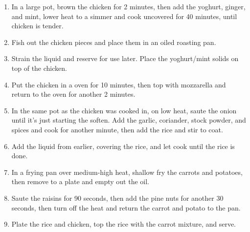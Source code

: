 \begin{enumerate}
    \item In a large pot, brown the chicken for 2 minutes, then add the yoghurt, ginger, and mint, lower heat to a simmer and cook uncovered for 40 minutes, until chicken is tender.
    \item Fish out the chicken pieces and place them in an oiled roasting pan.
    \item Strain the liquid and reserve for use later. Place the yoghurt/mint solids on top of the chicken.
    \item Put the chicken in a  oven for 10 minutes, then top with mozzarella and return to the oven for another 2 minutes.
    \item In the same pot as the chicken was cooked in, on low heat, saute the onion until it's just starting the soften. Add the garlic, coriander, stock powder, and spices and cook for another minute, then add the rice and stir to coat.
    \item Add the liquid from earlier, covering the rice, and let cook until the rice is done.
    \item In a frying pan over medium-high heat, shallow fry the carrots and potatoes, then remove to a plate and empty out the oil.
    \item Saute the raisins for 90 seconds, then add the pine nuts for another 30 seconds, then turn off the heat and return the carrot and potato to the pan.
    \item Plate the rice and chicken, top the rice with the carrot mixture, and serve.
\end{enumerate}
